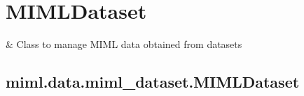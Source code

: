 \documentclass[letterpaper,10pt,english]{sphinxmanual}
\begin{document}
\sphinxstepscope


\section{MIMLDataset}
\label{\detokenize{data/miml_dataset:mimldataset}}\label{\detokenize{data/miml_dataset::doc}}

\begin{savenotes}\sphinxattablestart
\sphinxthistablewithglobalstyle
\sphinxthistablewithnovlinesstyle
\centering
\begin{tabulary}{\linewidth}[t]{}
\sphinxtoprule
\sphinxtableatstartofbodyhook
\sphinxAtStartPar
{\hyperref[\detokenize{data/_autosummary/miml.data.miml_dataset.MIMLDataset:miml.data.miml_dataset.MIMLDataset}]{}}
&
\sphinxAtStartPar
Class to manage MIML data obtained from datasets
\\
\sphinxbottomrule
\end{tabulary}
\sphinxtableafterendhook\par
\sphinxattableend\end{savenotes}

\sphinxstepscope


\subsection{miml.data.miml\_dataset.MIMLDataset}
\label{\detokenize{data/_autosummary/miml.data.miml_dataset.MIMLDataset:miml-data-miml-dataset-mimldataset}}\label{\detokenize{data/_autosummary/miml.data.miml_dataset.MIMLDataset::doc}}
\end{document}
